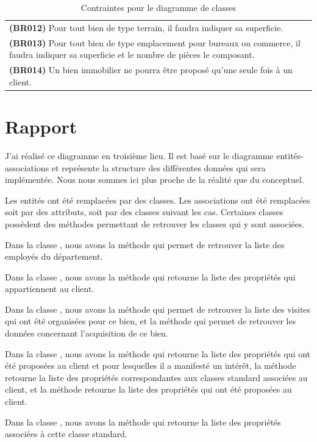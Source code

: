 \begin{table}
\begin{tabular}{|p{}|}
  \textbf{(BR012)} Pour tout bien de type \og{}terrain\fg{}, il faudra indiquer sa superficie. \\
  \textbf{(BR013)} Pour tout bien de type \og{}emplacement pour bureaux ou commerce\fg{}, il faudra indiquer sa superficie et le nombre de pièces le composant. \\
  \textbf{(BR014)} Un bien immobilier ne pourra être proposé qu'une seule fois à un client. \\
  \hline
  \end{tabular}
  \caption{Contraintes pour le diagramme de classes}
  \label{tbl_business_rules}
\end{table}


\section{Rapport}

J'ai réalisé ce diagramme en troisième lieu. Il est basé sur le diagramme entités-associations et représente la structure des différentes données qui sera implémentée. Nous nous sommes ici plus proche de la réalité que du conceptuel.

Les entités ont été remplacées par des classes. Les associations ont été remplacées soit par des attributs, soit par des classes suivant les cas. Certaines classes possèdent des méthodes permettant de retrouver les classes qui y sont associées.

Dans la classe , nous avons la méthode  qui permet de retrouver la liste des employés du département.

Dans la classe , nous avons la méthode  qui retourne la liste des propriétés qui appartiennent au client.

Dans la classe , nous avons la méthode  qui permet de retrouver la liste des visites qui ont été organisées pour ce bien, et la méthode  qui permet de retrouver les données concernant l'acquisition de ce bien.

Dans la classe , nous avons la méthode  qui retourne la liste des propriétés qui ont été proposées au client et pour lesquelles il a manifesté un intérêt, la méthode  retourne la liste des propriétés correspondantes aux classes standard associées au client, et la méthode  retourne la liste des propriétés qui ont été proposées au client.

Dans la classe , nous avons la méthode  qui retourne la liste des propriétés associées à cette classe standard.